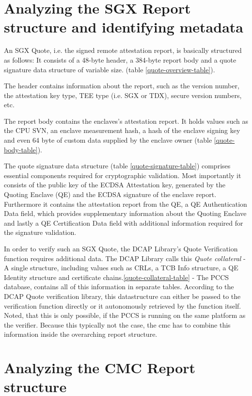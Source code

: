 \section{Analyzing the SGX Report structure and identifying metadata}

An SGX Quote, i.e. the signed remote attestation report, is basically structured as follows: It consists of a 48-byte header, a 384-byte report body and a quote signature data structure of variable size. (table \ref{quote-overview-table}).

The header contains information about the report, such as the version number, the attestation key type, TEE type (i.e. SGX or TDX), secure version numbers, etc. 

The report body contains the enclaves's attestation report. It holds values such as the CPU SVN, an enclave measurement hash, a hash of the enclave signing key and even 64 byte of custom data supplied by the enclave owner (table \ref{quote-body-table}).

The quote signature data structure (table \ref{quote-signature-table}) comprises essential components required for cryptographic validation. Most importantly it consists of the public key of the ECDSA Attestation key, generated by the Quoting Enclave (QE) and the ECDSA signature of the enclave report. Furthermore it contains the attestation report from the QE, a QE Authentication Data field, which provides supplementary information about the Quoting Enclave and lastly a QE Certification Data field with additional information required for the signature validation. \cite{dcap_library_doc}

In order to verify such an SGX Quote, the DCAP Library's Quote Verification function requires additional data. The DCAP Library calls this \textit{Quote collateral} - A single structure, including values such as CRLs, a TCB Info structure, a QE Identity structure and certificate chains.\ref{quote-collateral-table} - The PCCS database, contains all of this information in separate tables. According to the DCAP Quote verification library, this datastructure can either be passed to the verification function directly or it autonomously retrieved by the function itself. Noted, that this is only possible, if the PCCS is running on the same platform as the verifier. 
Because this typically not the case, the cmc has to combine this information inside the overarching report structure. 

\section{Analyzing the CMC Report structure}

